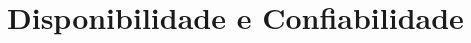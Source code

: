 \documentclass[12pt]{article}
\newcommand{\rev}[1]{\textcolor{black}{{#1}}}
\begin{document}

\section{Disponibilidade e Confiabilidade}
\label{sec:results}


\end{document}
